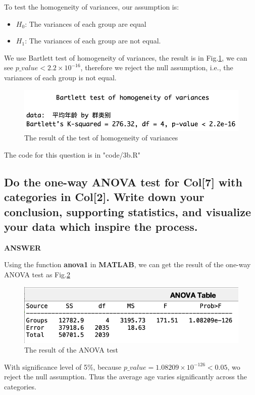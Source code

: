 \documentclass[a4paper]{article}
\begin{document}
To test the homogeneity of variances, our assumption is:
\begin{itemize}
	\item $H_0$: The variances of each group are equal
	\item $H_1$: The variances of each group are not equal.
\end{itemize}

We use Bartlett test of homogeneity of variances, the result is in Fig.\ref{3b1}, we can see $p\_value < 2.2\times10^{-16}$, therefore we reject the null assumption, i.e., the variances of each group is not equal.

\begin{figure}[h]
	\centering
	\includegraphics[width=0.7\linewidth]{images/3b.png}
	\caption{\label{3b1}The result of the test of homogeneity of variances}
\end{figure}

The code for this question is in "code/3b.R"

\subsection{Do the one-way ANOVA test for Col[7] with categories in Col[2]. Write down your conclusion, supporting statistics, and visualize your data which inspire the process.}
\label{subsec:3c}
\textbf{ANSWER}



Using the function \textbf{anova1} in \textbf{MATLAB}, we can get the result of the one-way ANOVA test as Fig.\ref{3c}
\begin{figure}[h]
	\centering
	\includegraphics[width=0.8\linewidth]{images/3c.png}
	\caption{\label{3c}The result of the ANOVA test}
\end{figure}

With significance level of 5\%, because $p\_value=1.08209\times 10^{-126}<0.05$, wo reject the null assumption. Thus the average age varies significantly across the categories.
\end{document}
